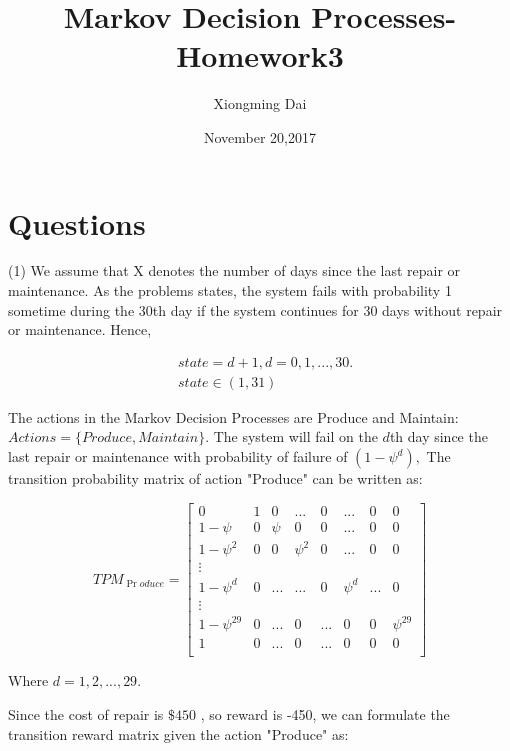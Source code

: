 \documentclass[12pt]{article}%
\begin{document}
\title{Markov Decision Processes-Homework3}
\author{Xiongming Dai}
\date{November 20,2017}
\maketitle
\section{Questions}

    (1) We assume that X  denotes the number of days since the last repair or maintenance. As the problems states, the system fails with probability 1 sometime during the 30th day if the system continues for 30 days without repair or maintenance. Hence, 

\begin{align}
  & state=d+1,d=0,1,...,30. \\ 
 & state\in (1,31) 
\end{align}

The actions in the Markov Decision Processes are Produce and Maintain:\\
 $Actions=\{Produce,Maintain\}$.
The system will fail on the $d$th day since the last repair or maintenance with probability of failure of 
$(1-{{\psi }^{d}}),$ The transition probability matrix of action "Produce" can be written as:

\[TP{{M}_{\Pr oduce}}=\left[ \begin{matrix}
   0 & 1 & 0 & ... & 0 & ... & 0 & 0  \\
   1-\psi  & 0 & \psi  & 0 & 0 & ... & 0 & 0  \\
   1-{{\psi }^{2}} & 0 & 0 & {{\psi }^{2}} & 0 & ... & 0 & 0  \\
   \vdots  & {} & {} & {} & {} & {} & {} & {}  \\
   1-{{\psi }^{d}} & 0 & ... & ... & 0 & {{\psi }^{d}} & ... & 0  \\
   \vdots  & {} & {} & {} & {} & {} & {} & {}  \\
   1-{{\psi }^{29}} & 0 & ... & 0 & ... & 0 & 0 & {{\psi }^{29}}  \\
   1 & 0 & ... & 0 & ... & 0 & 0 & 0  \\
\end{matrix} \right]\]

Where $d=1,2,...,29.$

Since the cost of repair is $\$450$ , so reward is -450, we can formulate the transition reward matrix given the action "Produce" as:
\end{document}

